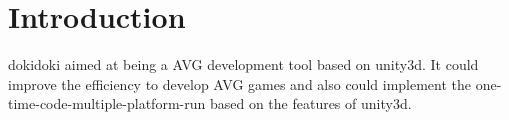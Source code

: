 \chapter{Introduction}

dokidoki aimed at being a AVG development tool based on unity3d. It could improve the efficiency to develop AVG games and also could implement the one-time-code-multiple-platform-run based on the features of unity3d.